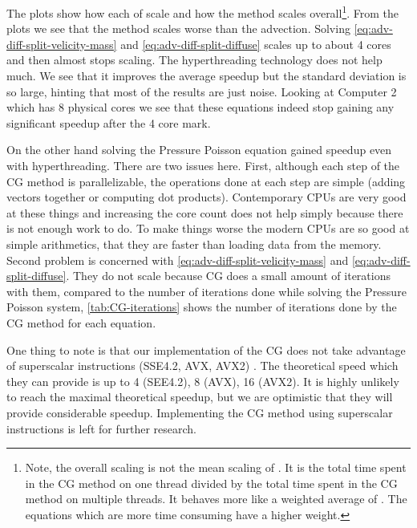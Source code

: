 The plots show how each of  scale and how the method scales overall\footnote{Note, the overall scaling is not the mean scaling of . It is the total time spent in the CG method on one thread divided by the total time spent in the CG method on multiple threads. It behaves more like a weighted average of . The equations which are more time consuming have a higher weight.}. From the plots we see that the method scales worse than the advection. Solving \cref{eq:adv-diff-split-velicity-mass} and \cref{eq:adv-diff-split-diffuse} scales up to about 4 cores and then almost stops scaling. The hyperthreading technology does not help much. We see that it improves the average speedup but the standard deviation is so large, hinting that most of the results are just noise. Looking at Computer 2 which has 8 physical cores we see that these equations indeed stop gaining any significant speedup after the 4 core mark.

On the other hand solving the Pressure Poisson equation gained speedup even with hyperthreading. There are two issues here. First, although each step of the CG method is parallelizable, the operations done at each step are simple (adding vectors together or computing dot products). Contemporary CPUs are very good at these things and increasing the core count does not help simply because there is not enough work to do. To make things worse the modern CPUs are so good at simple arithmetics, that they are faster than loading data from the memory. Second problem is concerned with \cref{eq:adv-diff-split-velicity-mass} and \cref{eq:adv-diff-split-diffuse}. They do not scale because CG does a small amount of iterations with them, compared to the number of iterations done while solving the Pressure Poisson system, \cref{tab:CG-iterations} shows the number of iterations done by the CG method for each equation.

One thing to note is that our implementation of the CG does not take advantage of superscalar instructions (SSE4.2, AVX, AVX2)  \cite{x86-manual}. The theoretical speed which they can provide is up to 4 (SEE4.2), 8 (AVX), 16 (AVX2). It is highly unlikely to reach the maximal theoretical speedup, but we are optimistic that they will provide considerable speedup. Implementing the CG method using superscalar instructions is left for further research.

